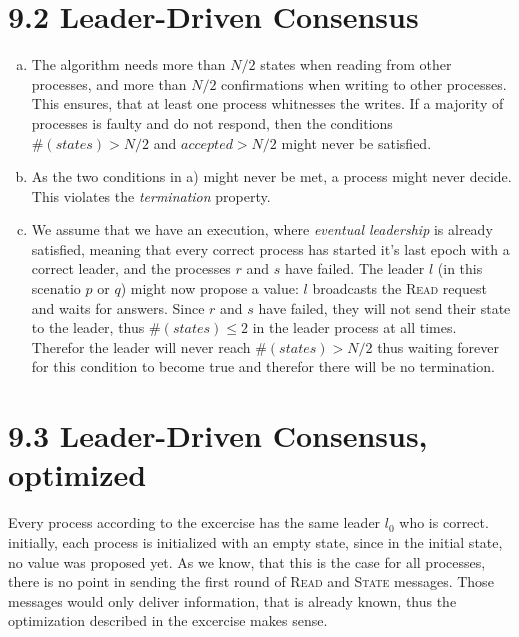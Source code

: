 \documentclass{article}
\begin{document}
    \section*{9.2 Leader-Driven Consensus}
    \begin{enumerate}[a)]
        \item The algorithm needs more than $N/2$ states when reading from other processes, and more than $N/2$ confirmations when writing to other processes.
        This ensures, that at least one process whitnesses the writes. If a majority of processes is faulty and do not respond, then the conditions $\#(states) > N/2$ and $accepted > N/2$ might never be satisfied.
        \item As the two conditions in a) might never be met, a process might never decide. This violates the \textit{termination} property.
        \item We assume that we have an execution, where \textit{eventual leadership} is already satisfied, meaning that every correct process has started it's last epoch with a correct leader, and the processes $r$ and $s$ have failed.
        The leader $l$ (in this scenatio $p$ or $q$) might now propose a value: $l$ broadcasts the \textsc{Read} request and waits for answers.
        Since $r$ and $s$ have failed, they will not send their state to the leader, thus $\#(states) \leq 2$ in the leader process at all times.
        Therefor the leader will never reach $\#(states) > N/2$ thus waiting forever for this condition to become true and therefor there will be no termination.
    \end{enumerate}

    \section*{9.3 Leader-Driven Consensus, optimized}
    Every process according to the excercise has the same leader $l_0$ who is correct. 
    initially, each process is initialized with an empty state, since in the initial state, no value was proposed yet.
    As we know, that this is the case for all processes, there is no point in sending the first round of \textsc{Read} and \textsc{State} messages.
    Those messages would only deliver information, that is already known, thus the optimization described in the excercise makes sense.
    
    
\end{document}
